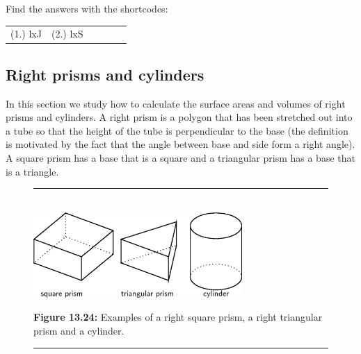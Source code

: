 \label{m39357*id73452}
\par {} Find the answers with the shortcodes:
 \par \begin{tabular}[h]{cccccc}
 (1.) lxJ  &  (2.) lxS  & \end{tabular}



            \subsection{ Right prisms and cylinders}
            \nopagebreak
            
      \label{m39357*id62680}In this section we study how to calculate the surface areas and volumes of right prisms and cylinders. A right prism is a polygon that has been stretched out into a tube so that the height of the tube is perpendicular to the base (the definition is motivated by the fact that the angle between base and side form a right angle). A square prism has a base that is a square and a triangular prism has a base that is a triangle.\par 
      
    \setcounter{subfigure}{0}


	\begin{figure}[H] %
    \begin{center}
    \rule[.1in]{\figurerulewidth}{.005in} \\
        \label{m39357*uid10!!!underscore!!!media}\label{m39357*uid10!!!underscore!!!printimage}\includegraphics[width=300px]{col11306.imgs/m39357_MG10C14_001.png} %
        
      \vspace{2pt}
    \vspace{\rubberspace}\par \begin{cnxcaption}
	  \small \textbf{Figure 13.24: }Examples of a right square prism, a right triangular prism and a cylinder.
	\end{cnxcaption}
      
    \vspace{.1in}
    \rule[.1in]{\figurerulewidth}{.005in} \\
        
    \end{center}

 \end{figure}   


